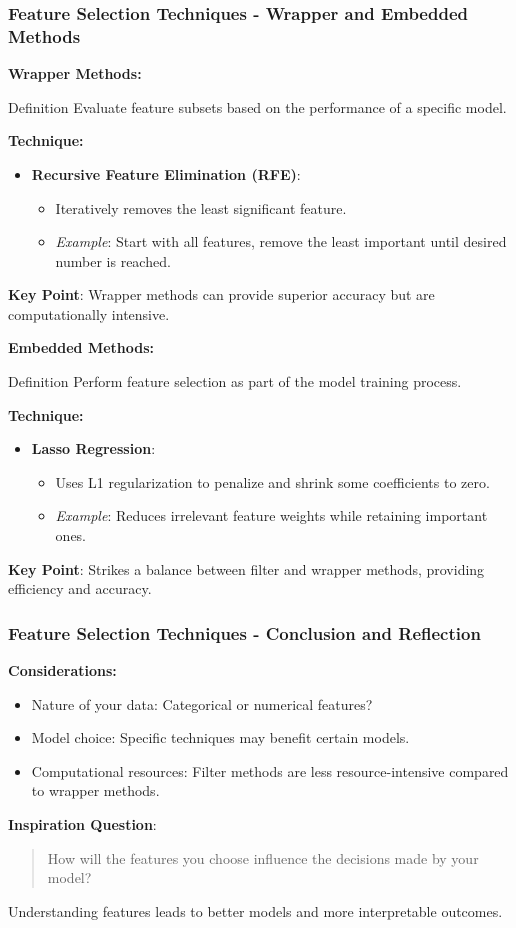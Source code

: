 \documentclass[aspectratio=169]{beamer}
\begin{document}
\begin{frame}[fragile]
    \frametitle{Feature Selection Techniques - Wrapper and Embedded Methods}
    \textbf{Wrapper Methods:}
    \begin{block}{Definition}
        Evaluate feature subsets based on the performance of a specific model.
    \end{block}
    \textbf{Technique:}
    \begin{itemize}
        \item \textbf{Recursive Feature Elimination (RFE)}:
            \begin{itemize}
                \item Iteratively removes the least significant feature.
                \item \textit{Example}: Start with all features, remove the least important until desired number is reached.
            \end{itemize}
    \end{itemize}
    \textbf{Key Point}: Wrapper methods can provide superior accuracy but are computationally intensive.

    \bigskip

    \textbf{Embedded Methods:}
    \begin{block}{Definition}
        Perform feature selection as part of the model training process.
    \end{block}
    \textbf{Technique:}
    \begin{itemize}
        \item \textbf{Lasso Regression}:
            \begin{itemize}
                \item Uses L1 regularization to penalize and shrink some coefficients to zero.
                \item \textit{Example}: Reduces irrelevant feature weights while retaining important ones.
            \end{itemize}
    \end{itemize}
    \textbf{Key Point}: Strikes a balance between filter and wrapper methods, providing efficiency and accuracy.
\end{frame}

\begin{frame}[fragile]
    \frametitle{Feature Selection Techniques - Conclusion and Reflection}
    \textbf{Considerations:}
    \begin{itemize}
        \item Nature of your data: Categorical or numerical features?
        \item Model choice: Specific techniques may benefit certain models.
        \item Computational resources: Filter methods are less resource-intensive compared to wrapper methods.
    \end{itemize}
    \textbf{Inspiration Question}: 
    \begin{quote}
        How will the features you choose influence the decisions made by your model?
    \end{quote}
    Understanding features leads to better models and more interpretable outcomes.
\end{frame}
\end{document}
